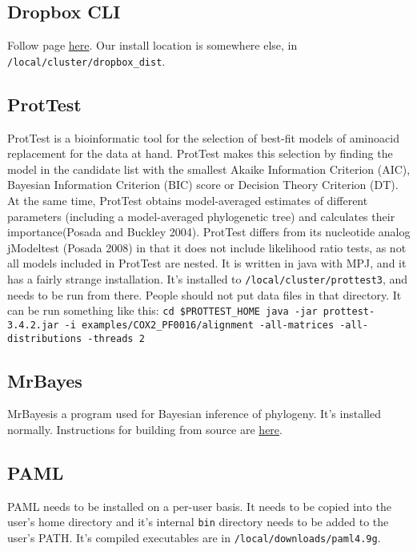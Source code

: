 \documentclass[]{book}
\begin{document}
\subsection{Dropbox CLI}\label{dropbox-cli}

Follow page \href{https://www.dropbox.com/install-linux}{here}. Our
install location is somewhere else, in
\texttt{/local/cluster/dropbox\_dist}.

\subsection{ProtTest}\label{prottest}

ProtTest is a bioinformatic tool for the selection of best-fit models of
aminoacid replacement for the data at hand. ProtTest makes this
selection by finding the model in the candidate list with the smallest
Akaike Information Criterion (AIC), Bayesian Information Criterion (BIC)
score or Decision Theory Criterion (DT). At the same time, ProtTest
obtains model-averaged estimates of different parameters (including a
model-averaged phylogenetic tree) and calculates their importance(Posada
and Buckley 2004). ProtTest differs from its nucleotide analog
jModeltest (Posada 2008) in that it does not include likelihood ratio
tests, as not all models included in ProtTest are nested. It is written
in java with MPJ, and it has a fairly strange installation. It's
installed to \texttt{/local/cluster/prottest3}, and needs to be run from
there. People should not put data files in that directory. It can be run
something like this:
\texttt{cd\ \$PROTTEST\_HOME\ java\ -jar\ prottest-3.4.2.jar\ -i\ examples/COX2\_PF0016/alignment\ -all-matrices\ -all-distributions\ -threads\ 2}

\subsection{MrBayes}\label{mrbayes}

MrBayesis a program used for Bayesian inference of phylogeny. It's
installed normally. Instructions for building from source are
\href{https://github.com/NBISweden/MrBayes}{here}.

\subsection{PAML}\label{paml}

PAML needs to be installed on a per-user basis. It needs to be copied
into the user's home directory and it's internal \texttt{bin} directory
needs to be added to the user's PATH. It's compiled executables are in
\texttt{/local/downloads/paml4.9g}.
\end{document}

